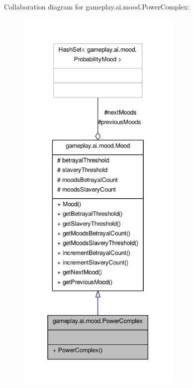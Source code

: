 Collaboration diagram for gameplay.\-ai.\-mood.\-Power\-Complex\-:
\nopagebreak
\begin{figure}[H]
\begin{center}
\leavevmode
\includegraphics[height=550pt]{classgameplay_1_1ai_1_1mood_1_1_power_complex__coll__graph}
\end{center}
\end{figure}

